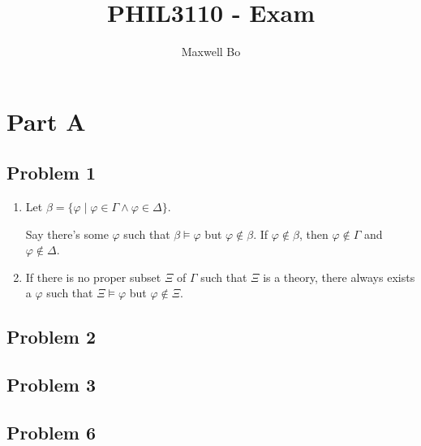 \documentclass[a4paper]{article}
\title{PHIL3110 - Exam}
\author{Maxwell Bo}
\newcommand{\SET}[1]{\{ {#1} \}}
\begin{document}
 

\maketitle

\section*{Part A}

\subsection*{Problem 1}

\begin{enumerate}

    \item

Let $\beta = \SET{ \varphi \mid \varphi \in \Gamma \wedge \varphi \in \Delta }$.

Say there's some $\varphi$ such that $\beta \models \varphi$ but $\varphi \not\in \beta$. If $\varphi \not\in \beta$, then $\varphi \not\in \Gamma$ and $\varphi \not\in \Delta$.

    \item

If there is no proper subset $\Xi$ of $\Gamma$ such that $\Xi$ is a theory, there always exists a $\varphi$ such that $\Xi \models \varphi$ but $\varphi \not\in \Xi$.

\end{enumerate}

\subsection*{Problem 2}

    \begin{prooftree}
    \end{prooftree}


\subsection*{Problem 3}

\subsection*{Problem 6}
\end{document}
